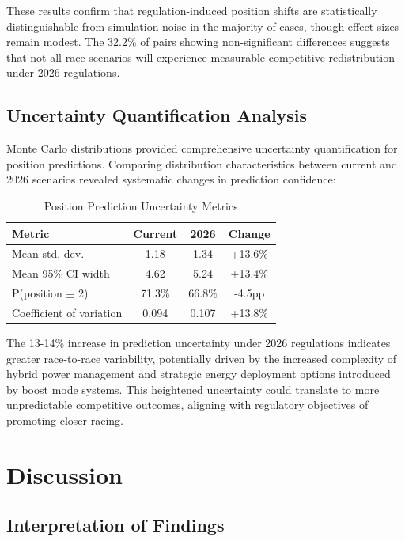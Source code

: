 \documentclass[conference]{IEEEtran}
\begin{document}
These results confirm that regulation-induced position shifts are statistically distinguishable from simulation noise in the majority of cases, though effect sizes remain modest. The 32.2\% of pairs showing non-significant differences suggests that not all race scenarios will experience measurable competitive redistribution under 2026 regulations.

\subsection{Uncertainty Quantification Analysis}

Monte Carlo distributions provided comprehensive uncertainty quantification for position predictions. Comparing distribution characteristics between current and 2026 scenarios revealed systematic changes in prediction confidence:

\begin{table}[h]
\centering
\caption{Position Prediction Uncertainty Metrics}
\begin{tabular}{lccc}
\toprule
\textbf{Metric} & \textbf{Current} & \textbf{2026} & \textbf{Change} \\
\midrule
Mean std. dev. & 1.18 & 1.34 & +13.6\% \\
Mean 95\% CI width & 4.62 & 5.24 & +13.4\% \\
P(position $\pm$ 2) & 71.3\% & 66.8\% & -4.5pp \\
Coefficient of variation & 0.094 & 0.107 & +13.8\% \\
\bottomrule
\end{tabular}
\label{tab:uncertainty}
\end{table}

The 13-14\% increase in prediction uncertainty under 2026 regulations indicates greater race-to-race variability, potentially driven by the increased complexity of hybrid power management and strategic energy deployment options introduced by boost mode systems. This heightened uncertainty could translate to more unpredictable competitive outcomes, aligning with regulatory objectives of promoting closer racing.

\section{Discussion}

\subsection{Interpretation of Findings}
\end{document}

